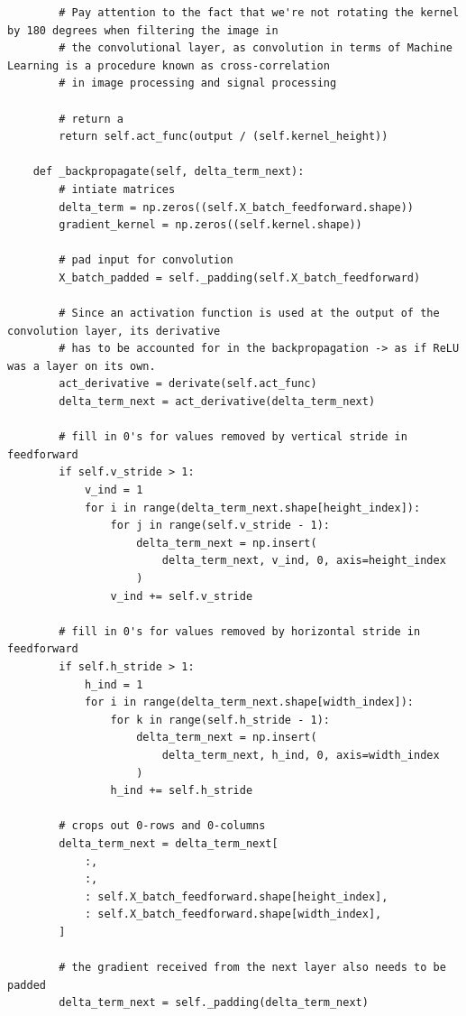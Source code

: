 \documentclass[%
oneside,                 %
final,                   %
10pt]{article}
\begin{document}
\begin{verbatim}
        # Pay attention to the fact that we're not rotating the kernel by 180 degrees when filtering the image in
        # the convolutional layer, as convolution in terms of Machine Learning is a procedure known as cross-correlation
        # in image processing and signal processing

        # return a
        return self.act_func(output / (self.kernel_height))

    def _backpropagate(self, delta_term_next):
        # intiate matrices
        delta_term = np.zeros((self.X_batch_feedforward.shape))
        gradient_kernel = np.zeros((self.kernel.shape))

        # pad input for convolution
        X_batch_padded = self._padding(self.X_batch_feedforward)

        # Since an activation function is used at the output of the convolution layer, its derivative
        # has to be accounted for in the backpropagation -> as if ReLU was a layer on its own.
        act_derivative = derivate(self.act_func)
        delta_term_next = act_derivative(delta_term_next)

        # fill in 0's for values removed by vertical stride in feedforward
        if self.v_stride > 1:
            v_ind = 1
            for i in range(delta_term_next.shape[height_index]):
                for j in range(self.v_stride - 1):
                    delta_term_next = np.insert(
                        delta_term_next, v_ind, 0, axis=height_index
                    )
                v_ind += self.v_stride

        # fill in 0's for values removed by horizontal stride in feedforward
        if self.h_stride > 1:
            h_ind = 1
            for i in range(delta_term_next.shape[width_index]):
                for k in range(self.h_stride - 1):
                    delta_term_next = np.insert(
                        delta_term_next, h_ind, 0, axis=width_index
                    )
                h_ind += self.h_stride

        # crops out 0-rows and 0-columns
        delta_term_next = delta_term_next[
            :,
            :,
            : self.X_batch_feedforward.shape[height_index],
            : self.X_batch_feedforward.shape[width_index],
        ]

        # the gradient received from the next layer also needs to be padded
        delta_term_next = self._padding(delta_term_next)


\end{verbatim}
\end{document}
